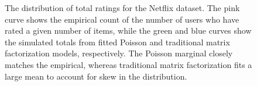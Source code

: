 \begin{figure}[t!]
  \centering
  \caption{The distribution of total ratings for the Netflix dataset.
    The pink curve shows the empirical count of the number of users
    who have rated a given number of items, while the green and blue
    curves show the simulated totals from fitted Poisson and
    traditional matrix factorization models, respectively. The Poisson
    marginal closely matches the empirical, whereas traditional matrix
    factorization fits a large mean to account for skew in the
    distribution.}
\label{fig:marginals}
\end{figure}




